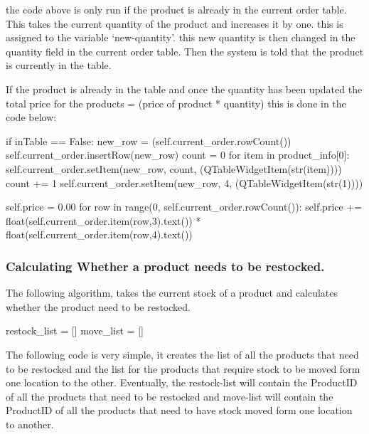 the code above is only run if the product is already in the current order table. This takes the current quantity of the product and increases it by one. this is assigned to the variable `new-quantity'. this new quantity is then changed in the quantity field in the current order table. Then the system is told that the product is currently in the table.

If the product is already in the table and once the quantity has been updated the total price for the products = (price of product * quantity) this is done in the code below:

\begin{python}
if inTable == False:
            new_row = (self.current_order.rowCount())
            self.current_order.insertRow(new_row)
            count = 0
            for item in product_info[0]:
                self.current_order.setItem(new_row, count, (QTableWidgetItem(str(item))))
                count += 1
            self.current_order.setItem(new_row, 4, (QTableWidgetItem(str(1))))

        self.price = 0.00
        for row in range(0, self.current_order.rowCount()):
            self.price += float(self.current_order.item(row,3).text()) * float(self.current_order.item(row,4).text())
\end{python}

\pagebreak

\subsubsection{Calculating Whether a product needs to be restocked.}

The following algorithm, takes the current stock of a product and calculates whether the product need to be restocked.


\begin{python}
restock_list = []
move_list = []
\end{python}

The following code is very simple, it creates the list of all the products that need to be restocked and the list for the products that require stock to be moved form one location to the other. Eventually, the restock-list will contain the ProductID of all the products that need to be restocked and move-list will contain the ProductID of all the products that need to have stock moved form one location to another.


